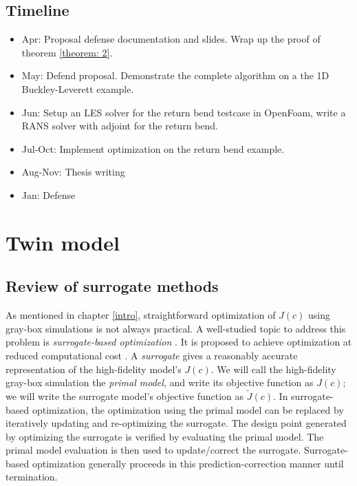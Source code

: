 \documentclass[a4paper,onecolumn]{article}
\theoremstyle{remark}
\begin{document}
\subsection{Timeline}
\begin{itemize}
    \item Apr: Proposal defense documentation and slides. Wrap up the proof of theorem \ref{theorem: 2}.
    \item May: Defend proposal. Demonstrate the complete algorithm on a the 1D Buckley-Leverett example.
    \item Jun: Setup an LES solver for the return bend testcase in OpenFoam, write a RANS solver with adjoint for the return bend.
    \item Jul-Oct: Implement optimization on the return bend example.
    \item Aug-Nov: Thesis writing
    \item Jan: Defense
\end{itemize}

\newpage
\section{Twin model}
\label{gradient_surrogate}
\subsection{Review of surrogate methods}
\label{review surrogate methods}
\noindent As mentioned in chapter \ref{intro}, 
straightforward optimization of $J(c)$ using gray-box simulations
is not always practical.
A well-studied topic to address this problem is \emph{surrogate-based optimization}
\cite{Opt Koziel Book, Surrogate based analysis and optimization}.
It is proposed to achieve optimization at reduced computational cost \cite{Space mapping 1}.
A \emph{surrogate} gives a reasonably accurate representation of the high-fidelity model's $J(c)$.
We will call the high-fidelity gray-box simulation
the \emph{primal model}, and write its objective function as $J(c)$;
we will write the surrogate model's objective function as $\tilde{J}(c)$.
In surrogate-based optimization, the optimization using the primal model can be
replaced by iteratively updating and re-optimizing the surrogate.
The design point generated by optimizing the surrogate is verified by evaluating
the primal model. The primal model evaluation is then used to update/correct the surrogate.
Surrogate-based optimization generally proceeds in this prediction-correction manner until
termination.\\
\end{document}
